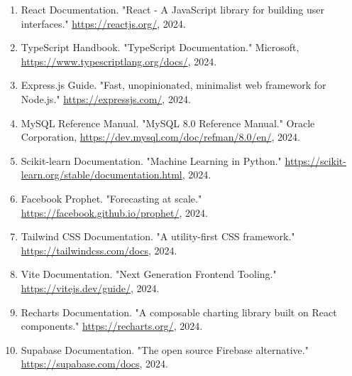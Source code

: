 \documentclass[12pt,a4paper]{article}
\begin{document}
\begin{enumerate}
    \item React Documentation. "React - A JavaScript library for building user interfaces." \url{https://reactjs.org/}, 2024.

    \item TypeScript Handbook. "TypeScript Documentation." Microsoft, \url{https://www.typescriptlang.org/docs/}, 2024.

    \item Express.js Guide. "Fast, unopinionated, minimalist web framework for Node.js." \url{https://expressjs.com/}, 2024.

    \item MySQL Reference Manual. "MySQL 8.0 Reference Manual." Oracle Corporation, \url{https://dev.mysql.com/doc/refman/8.0/en/}, 2024.

    \item Scikit-learn Documentation. "Machine Learning in Python." \url{https://scikit-learn.org/stable/documentation.html}, 2024.

    \item Facebook Prophet. "Forecasting at scale." \url{https://facebook.github.io/prophet/}, 2024.

    \item Tailwind CSS Documentation. "A utility-first CSS framework." \url{https://tailwindcss.com/docs}, 2024.

    \item Vite Documentation. "Next Generation Frontend Tooling." \url{https://vitejs.dev/guide/}, 2024.

    \item Recharts Documentation. "A composable charting library built on React components." \url{https://recharts.org/}, 2024.

    \item Supabase Documentation. "The open source Firebase alternative." \url{https://supabase.com/docs}, 2024.
\end{enumerate}
\end{document}
